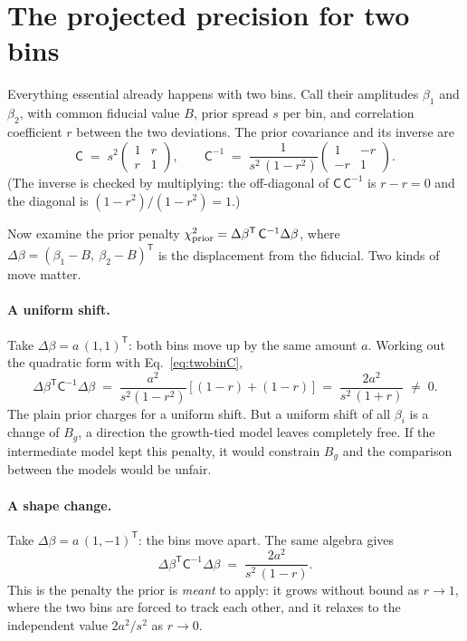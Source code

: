\documentclass[11pt]{article}
\newcommand{\Cov}{\mathsf{C}}
\newcommand{\T}{^{\mathsf{T}}}
\begin{document}
\section{The projected precision for two bins}
\label{sec:twobins}

Everything essential already happens with two bins.  Call their
amplitudes $\beta_1$ and $\beta_2$, with common fiducial value $B$,
prior spread $s$ per bin, and correlation coefficient $r$ between the
two deviations.  The prior covariance and its inverse are
\begin{equation}
  \Cov \;=\; s^2
  \begin{pmatrix} 1 & r \\ r & 1 \end{pmatrix},
  \qquad
  \Cov^{-1} \;=\; \frac{1}{s^2\,(1 - r^2)}
  \begin{pmatrix} 1 & -r \\ -r & 1 \end{pmatrix}.
  \label{eq:twobinC}
\end{equation}
(The inverse is checked by multiplying: the off-diagonal of
$\Cov\,\Cov^{-1}$ is $r - r = 0$ and the diagonal is
$(1 - r^2)/(1 - r^2) = 1$.)

Now examine the prior penalty
$\chi^2_{\rm prior} = \Delta\beta\T\, \Cov^{-1} \Delta\beta$, where
$\Delta\beta = (\beta_1 - B,\ \beta_2 - B)\T$ is the displacement from
the fiducial.  Two kinds of move matter.

\paragraph{A uniform shift.}
Take $\Delta\beta = a\,(1, 1)\T$: both bins move up by the same amount
$a$.  Working out the quadratic form with Eq.~\eqref{eq:twobinC},
\begin{equation}
  \Delta\beta\T \Cov^{-1} \Delta\beta
  \;=\;
  \frac{a^2}{s^2 (1 - r^2)}\,
  \bigl[\,(1 - r) + (1 - r)\,\bigr]
  \;=\;
  \frac{2 a^2}{s^2\,(1 + r)}
  \;\neq\; 0 .
  \label{eq:shiftpenalty}
\end{equation}
The plain prior charges for a uniform shift.  But a uniform shift of
all $\beta_i$ is a change of $B_g$, a direction the growth-tied model leaves
completely free.  If the intermediate model kept this penalty, it would
constrain $B_g$ and the comparison between the models would be unfair.

\paragraph{A shape change.}
Take $\Delta\beta = a\,(1, -1)\T$: the bins move apart.  The same
algebra gives
\begin{equation}
  \Delta\beta\T \Cov^{-1} \Delta\beta
  \;=\;
  \frac{2 a^2}{s^2\,(1 - r)} .
  \label{eq:shapepenalty}
\end{equation}
This is the penalty the prior is \emph{meant} to apply: it grows
without bound as $r \to 1$, where the two bins are forced to track each
other, and it relaxes to the independent value $2a^2/s^2$ as
$r \to 0$.
\end{document}
